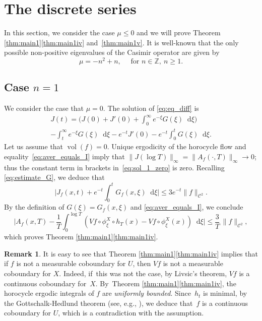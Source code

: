 \documentclass[10pt]{amsart}
\newcommand \Z{\mathbb{Z}}
\newcommand*{\diff}{\mathop{}\!\mathrm{d}}
\newcommand{\aver}[1]{A_{#1}(x,T)}
\DeclareMathOperator{\vol}{vol}
\theoremstyle{definition}
\newtheorem{remark}[theorem]{Remark}
\begin{document}
\section{The discrete series}\label{section:discrete_ser}

In this section, we consider the case $\mu \leq 0$ and we will prove Theorem \ref{thm:main1}\eqref{thm:main1iv} and~\eqref{thm:main1v}. It is well-known \cite{Bar} that the only possible non-positive eigenvalues of the Casimir operator are given by
\[
\mu = -n^2+n, \quad \text{ for }n \in \Z,\ n \geq 1.
\]

\subsection{Case $n=1$}
We consider the case that $\mu = 0$. The solution of \eqref{eq:eq_diff} is
\begin{multline}\label{eq:sol_1_zero}
J(t) = \biggl(J(0) + J'(0) + \int_0^\infty e^{-\xi}G(\xi) \diff \xi \biggr)\\
- \int_t^\infty e^{-\xi}G(\xi) \diff \xi - e^{-t} J'(0) - e^{-t}\int_0^t G(\xi) \diff \xi.
\end{multline}
Let us assume that $\vol(f)=0$. Unique ergodicity of the horocycle flow and equality~\eqref{eq:aver_equals_I} imply that $\|J(\log T) \|_\infty = \|A_f(\cdot, T) \|_\infty \to 0$; thus the constant term in brackets in~\eqref{eq:sol_1_zero} is zero.
Recalling \eqref{eq:estimate_G}, we deduce that
\[
\biggl\lvert J_f(x,t) + e^{-t}\int_0^t G_f(x,\xi) \diff \xi \biggr\rvert \leq 3 e^{-t} \|f\|_{\mathscr{C}^2}.
\]
By the definition of $G(\xi) = G_f(x,\xi)$ and \eqref{eq:aver_equals_I}, we conclude
\[
\biggl\lvert \aver{f} - \frac{1}{T} \int_0^{\log T} \left(Vf \circ \phi^X_\xi \circ h_T(x) - Vf\circ \phi^X_\xi (x) \right) \diff \xi \biggr\rvert \leq \frac{3}{T}\, \|f\|_{\mathscr{C}^2},
\]
which proves Theorem \ref{thm:main1}\eqref{thm:main1iv}.

\begin{remark}\label{remark:Vf_cob}
It is easy to see that Theorem \ref{thm:main1}\eqref{thm:main1iv} implies that if $f$ is not a measurable coboundary for $U$, then $Vf$ is not a measurable coboundary for $X$. Indeed, if~this was not the case, by Livsic's theorem, $Vf$ is a continuous coboundary for~$X$. By~Theorem \ref{thm:main1}\eqref{thm:main1iv}, the horocycle ergodic integrals of $f$ are \emph{uniformly bounded}. Since~$h_t$ is minimal, by the Gottschalk-Hedlund theorem (see, e.g., \cite[Th.\,C]{McC}), we deduce that~$f$ is a continuous coboundary for $U$, which is a contradiction with the assumption.
\end{remark}
\end{document}
